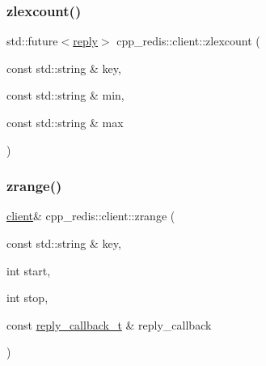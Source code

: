 \mbox{\label{classcpp__redis_1_1client_ace7bbf92a0ea2cac775e5bc66a0d1ea8}} 
\subsubsection{\texorpdfstring{zlexcount()}{zlexcount()}\hspace{0.1cm}{\footnotesize\ttfamily [6/6]}}
{\footnotesize\ttfamily std\+::future$<$\hyperlink{classcpp__redis_1_1reply}{reply}$>$ cpp\+\_\+redis\+::client\+::zlexcount (\begin{DoxyParamCaption}\item[{const std\+::string \&}]{key,  }\item[{const std\+::string \&}]{min,  }\item[{const std\+::string \&}]{max }\end{DoxyParamCaption})}

\mbox{\label{classcpp__redis_1_1client_a70025f24f20e81397868467651c804a9}} 
\subsubsection{\texorpdfstring{zrange()}{zrange()}\hspace{0.1cm}{\footnotesize\ttfamily [1/9]}}
{\footnotesize\ttfamily \hyperlink{classcpp__redis_1_1client}{client}\& cpp\+\_\+redis\+::client\+::zrange (\begin{DoxyParamCaption}\item[{const std\+::string \&}]{key,  }\item[{int}]{start,  }\item[{int}]{stop,  }\item[{const \hyperlink{classcpp__redis_1_1client_a061a1140d36d2eaeda82b09a0bb3f9f2}{reply\+\_\+callback\+\_\+t} \&}]{reply\+\_\+callback }\end{DoxyParamCaption})}

\mbox{\label{classcpp__redis_1_1client_a7a86805d2495c3866df9095ea71ab842}} 
